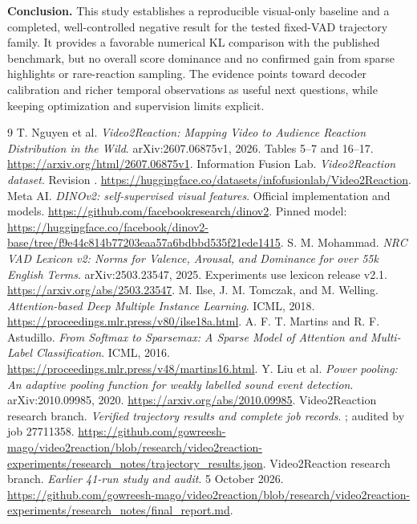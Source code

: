 \documentclass[11pt,a4paper]{article}
\newcommand{\keypoint}[1]{\par\smallskip\colorbox{soft}{\parbox{0.95\linewidth}{#1}}\par\smallskip}
\begin{document}
\keypoint{\textbf{Conclusion.} This study establishes a reproducible visual-only baseline and a completed, well-controlled negative result for the tested fixed-VAD trajectory family. It provides a favorable numerical KL comparison with the published benchmark, but no overall score dominance and no confirmed gain from sparse highlights or rare-reaction sampling. The evidence points toward decoder calibration and richer temporal observations as useful next questions, while keeping optimization and supervision limits explicit.}

\begin{thebibliography}{9}
 T. Nguyen et al. \emph{Video2Reaction: Mapping Video to Audience Reaction Distribution in the Wild}. arXiv:2607.06875v1, 2026. Tables 5--7 and 16--17. \url{https://arxiv.org/html/2607.06875v1}.
 Information Fusion Lab. \emph{Video2Reaction dataset}. Revision . \url{https://huggingface.co/datasets/infofusionlab/Video2Reaction}.
 Meta AI. \emph{DINOv2: self-supervised visual features}. Official implementation and models. \url{https://github.com/facebookresearch/dinov2}. Pinned model: \url{https://huggingface.co/facebook/dinov2-base/tree/f9e44c814b77203eaa57a6bdbbd535f21ede1415}.
 S. M. Mohammad. \emph{NRC VAD Lexicon v2: Norms for Valence, Arousal, and Dominance for over 55k English Terms}. arXiv:2503.23547, 2025. Experiments use lexicon release v2.1. \url{https://arxiv.org/abs/2503.23547}.
 M. Ilse, J. M. Tomczak, and M. Welling. \emph{Attention-based Deep Multiple Instance Learning}. ICML, 2018. \url{https://proceedings.mlr.press/v80/ilse18a.html}.
 A. F. T. Martins and R. F. Astudillo. \emph{From Softmax to Sparsemax: A Sparse Model of Attention and Multi-Label Classification}. ICML, 2016. \url{https://proceedings.mlr.press/v48/martins16.html}.
 Y. Liu et al. \emph{Power pooling: An adaptive pooling function for weakly labelled sound event detection}. arXiv:2010.09985, 2020. \url{https://arxiv.org/abs/2010.09985}.
 Video2Reaction research branch. \emph{Verified trajectory results and complete job records}. ; audited by job 27711358. \url{https://github.com/gowreesh-mago/video2reaction/blob/research/video2reaction-experiments/research_notes/trajectory_results.json}.
 Video2Reaction research branch. \emph{Earlier 41-run study and audit}. 5 October 2026. \url{https://github.com/gowreesh-mago/video2reaction/blob/research/video2reaction-experiments/research_notes/final_report.md}.
\end{thebibliography}
\end{document}
